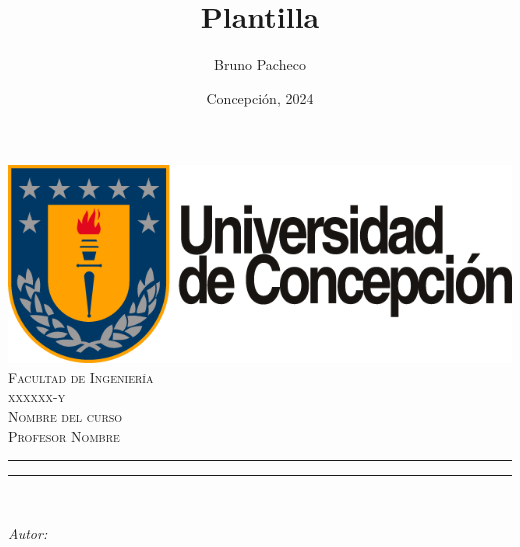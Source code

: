 \title{{\Large \\ Plantilla  \\[0.1 cm]}}

\author{Bruno Pacheco}
\date{Concepción, 2024}

\makeatletter
\let\thetitle\@title
\let\theauthor\@author
\let\thedate\@date
\makeatother

\pagestyle{fancy}
\fancyhf{}
\lhead{\thetitle}
\cfoot{\thepage}


\begin{titlepage}
    \centering
    \vspace*{0.0 cm}
    \includegraphics[scale = 0.2]{extras/logo_udec.png}\\[1.0 cm]    %
    \textsc{\LARGE Facultad de Ingeniería}\\[1.0 cm]    %
    \textsc{\Large xxxxxx-y }\\[0.5 cm]    %
    \textsc{\large Nombre del curso}\\[0.5 cm]        %
    \textsc{\large Profesor Nombre}\\[0.5 cm]
    \rule{\linewidth}{0.2 mm}
    {\huge \bfseries \thetitle}
    \rule{\linewidth}{0.2 mm} \\[1.5 cm]
    
    \begin{minipage}{0.6\textwidth}
    \begin{center} \large
        \emph{Autor:}\\
        \theauthor\linebreak
        \end{center}
    \end{minipage}\\[3cm]

    {\large \thedate}\\[0 cm]
\end{titlepage}


\fancyfoot[C]{\thepage}  %
\renewcommand{\footrulewidth}{0.4pt}
